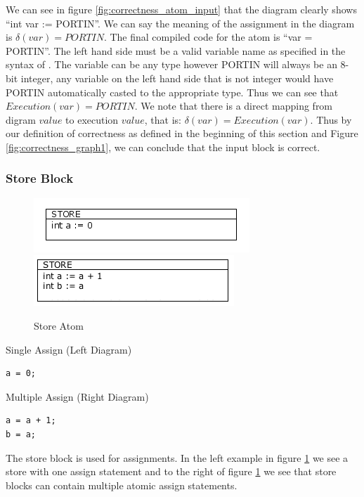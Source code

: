 We can see in figure \ref{fig:correctness_atom_input} that the diagram clearly shows ``int var := PORTIN''. We can say the meaning of the assignment in the diagram is $\delta(var) = PORTIN$. The final compiled code for the atom is ``var = PORTIN''. The left hand side must be a valid variable name as specified in the syntax of \plccharts. The variable can be any type however PORTIN will always be an 8-bit integer, any variable on the left hand side that is not integer would have PORTIN automatically casted to the appropriate type. Thus we can see that $Execution(var) = PORTIN$. We note that there is a direct mapping from digram $value$ to execution $value$, that is: $\delta(var) = Execution(var)$. Thus by our definition of correctness as defined in the beginning of this section and Figure \ref{fig:correctness_graph1}, we can conclude that the input block is correct.


\subsubsection{Store Block}

\begin{figure}[h]
	\centering
	\includegraphics[width=\imgmedphoto]{./images/correctness_atom_store_single.png}
	\includegraphics[width=\imgmedphoto]{./images/correctness_atom_store.png}
	\caption{Store Atom}
	\label{fig:correctness_atom_store}
\end{figure}

Single Assign (Left Diagram)
\begin{lstlisting}[frame=single]
a = 0;
\end{lstlisting}

Multiple Assign (Right Diagram)
\begin{lstlisting}[frame=single]
a = a + 1;
b = a;
\end{lstlisting}

The store block is used for assignments. In the left example in figure \ref{fig:correctness_atom_store} we see a store with one assign statement and to the right of figure \ref{fig:correctness_atom_store} we see that store blocks can contain multiple atomic assign statements. 

